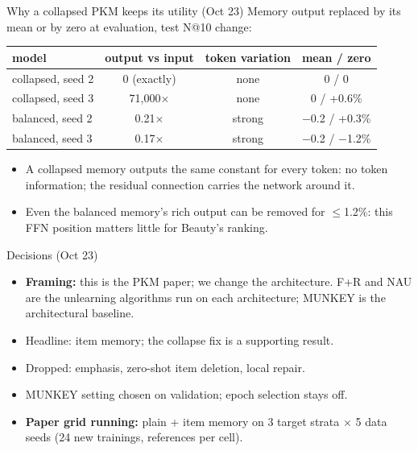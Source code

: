 \documentclass{beamer}
\begin{document}
\begin{frame}{Why a collapsed PKM keeps its utility (Oct 23)}
Memory output replaced by its mean or by zero at evaluation, test N@10 change:
\begin{center}
\footnotesize\setlength{\tabcolsep}{4pt}
\begin{tabular}{|l|c|c|c|}
\hline
model & output vs input & token variation & mean / zero \\
\hline
collapsed, seed 2 & 0 (exactly) & none & 0 / 0 \\
collapsed, seed 3 & 71{,}000$\times$ & none & 0 / +0.6\% \\
balanced, seed 2  & 0.21$\times$ & strong & $-$0.2 / +0.3\% \\
balanced, seed 3  & 0.17$\times$ & strong & $-$0.2 / $-$1.2\% \\
\hline
\end{tabular}
\end{center}
\begin{itemize}
  \item A collapsed memory outputs the same constant for every token: no token
        information; the residual connection carries the network around it.
  \item Even the balanced memory's rich output can be removed for $\leq$1.2\%:
        this FFN position matters little for Beauty's ranking.
\end{itemize}
\end{frame}

\begin{frame}{Decisions (Oct 23)}
\begin{itemize}
  \item \textbf{Framing:} this is the PKM paper; we change the architecture. F+R
        and NAU are the unlearning algorithms run on each architecture; MUNKEY is the architectural baseline.
  \item Headline: item memory; the collapse fix is a supporting result.
  \item Dropped: emphasis, zero-shot item deletion, local repair.
  \item MUNKEY setting chosen on validation; epoch selection stays off.
  \item \textbf{Paper grid running:} plain + item memory on 3 target strata
        $\times$ 5 data seeds (24 new trainings, references per cell).
\end{itemize}
\end{frame}
\end{document}
